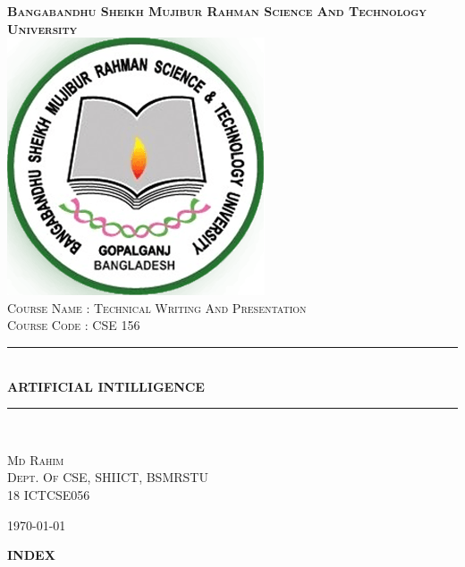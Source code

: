 \documentclass{article}
\begin{document}
\newpage

\begin{titlepage}

\pagecolor{teal!60}

\newcommand{\HRule}{\rule{\linewidth}{0.5mm}}

\center

\textsc{\textbf{\Large {Bangabandhu Sheikh Mujibur Rahman Science And Technology University}}}\\[.5cm] 
\includegraphics[scale=.19]{BSMRSTU-Logo.png}\\[1cm]
\textsc{\large Course Name : Technical Writing And Presentation}\\[0.5cm]
\textsc{\large Course Code : CSE 156}\\[0.5cm]

\HRule \\[0.4cm]
{ \huge \bfseries ARTIFICIAL INTILLIGENCE}\\[0.4cm]
\HRule \\[7cm]

\begin{flushright}

\textsc{\Large Md Rahim}\\
[2mm]
\textsc{\small Dept. Of CSE, SHIICT, BSMRSTU}\\
[1mm]
\textsc{\small 18 ICTCSE056}\\[0.9cm]

\end{flushright}

{\small \today}

\end{titlepage}


\begin{center}
\begin{Huge}
\textsc{\LARGE \textbf{\Huge I}\textbf{NDE}\textbf{\Huge X}}\\
[2.5cm]
\end{Huge}
\end{center}
\end{document}
